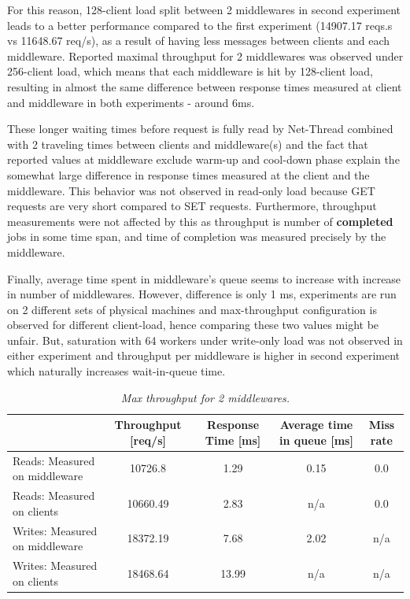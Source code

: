 \documentclass[11pt,a4paper]{article}
\begin{document}
For this reason, 128-client load split between 2 middlewares in second experiment leads to a better performance compared to the first experiment (14907.17 reqs.s vs 11648.67 req/s), as a result of having less messages between clients and each middleware. Reported maximal throughput for 2 middlewares was observed under 256-client load, which means that each middleware is hit by 128-client load, resulting in almost the same difference between response times measured at client and middleware in both experiments - around 6ms.

These longer waiting times before request is fully read by Net-Thread combined with 2 traveling times between clients and middleware(s) and the fact that reported values at middleware exclude warm-up and cool-down phase explain the somewhat large difference in response times measured at the client and the middleware. This behavior was not observed in read-only load because GET requests are very short compared to SET requests. Furthermore, throughput measurements were not affected by this as throughput is number of \textbf{completed} jobs in some time span, and time of completion was measured precisely by the middleware.

Finally, average time spent in middleware's queue seems to increase with increase in number of middlewares. However, difference is only 1 ms, experiments are run on 2 different sets of physical machines and max-throughput configuration is observed for different client-load, hence comparing these two values might be unfair. But, saturation with 64 workers under write-only load was not observed in either experiment and throughput per middleware is higher in second experiment which naturally increases wait-in-queue time.

\begin{center}
	\scriptsize{	
		\begin{table}[!ht]
			\centering
			\begin{tabulary}{\linewidth}{ | l | C | C | C | C |}
				\hline									&	Throughput [req/s]	&	Response Time [ms]	&	Average time in queue [ms]	&	Miss rate	\\
				\hline	Reads: Measured on middleware	&	10726.8		&	1.29	&	0.15	&	0.0	\\
				\hline	Reads: Measured on clients		&	10660.49	&	2.83	&	n/a		&	0.0	\\
				\hline	Writes: Measured on middleware	&	18372.19	&	7.68	&	2.02	&	n/a \\
				\hline	Writes: Measured on clients		&	18468.64	&	13.99	&	n/a 	&	n/a \\
				\hline 
			\end{tabulary}
			\caption{\textit{Max throughput for 2 middlewares.}}
			\label{table:baseline_2midd:max_xput}
		\end{table}
	}
\end{center}
\end{document}
